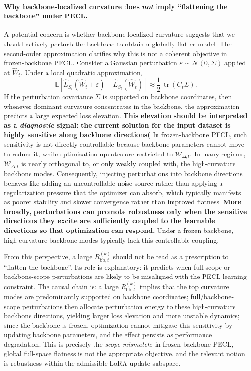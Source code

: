 \documentclass{article}
\theoremstyle{plain}
\theoremstyle{definition}
\theoremstyle{remark}
\begin{document}
\paragraph{Why backbone-localized curvature does \emph{not} imply ``flattening the backbone'' under PECL.}
A potential concern is whether backbone-localized curvature suggests that we should actively perturb the backbone to obtain a globally flatter model. The second-order approximation clarifies why this is not a coherent objective in frozen-backbone PECL. Consider a Gaussian perturbation $\varepsilon\sim\mathcal N(0,\Sigma)$ applied at $\hat W_t$. Under a local quadratic approximation,
$$
\mathbb E\!\left[\hat L_{S_t}(\hat W_t+\varepsilon)-\hat L_{S_t}(\hat W_t)\right]
\approx
\frac12\,\operatorname{tr}(C_t\Sigma).
$$
If the perturbation covariance $\Sigma$ is supported on backbone coordinates, then whenever dominant curvature concentrates in the backbone, the approximation predicts a large expected loss elevation. \textbf{This elevation should be interpreted as a \emph{diagnostic} signal: the current solution for the input dataset is highly sensitive along backbone directions( 
} 
In frozen-backbone PECL, such sensitivity is not directly controllable because backbone parameters cannot move to reduce it, while optimization updates are restricted to $\mathcal W_{\Delta,t}$. In many regimes, $\mathcal W_{\Delta,t}$ is nearly orthogonal to, or only weakly coupled with, the high-curvature backbone modes. Consequently, injecting perturbations into backbone directions behaves like adding an uncontrollable noise source rather than applying a regularization pressure that the optimizer can absorb, which typically manifests as poorer stability and slower convergence rather than improved flatness. \textbf{More broadly, perturbations can promote robustness only when the sensitive directions they excite are sufficiently coupled to the learnable directions so that optimization can respond.} Under a frozen backbone, high-curvature backbone modes typically lack this controllable coupling.

From this perspective, a large $R_{\mathrm{bb},t}^{(k)}$ should not be read as a prescription to ``flatten the backbone''. Its role is explanatory: it predicts when full-scope or backbone-scope perturbations are likely to be misaligned with the PECL learning constraint. The causal chain is: a large $R_{\mathrm{bb},t}^{(k)}$ implies that the top curvature modes are predominantly supported on backbone coordinates; full/backbone-scope perturbations then allocate perturbation energy to these high-curvature backbone directions, yielding larger loss elevation and more unstable dynamics; since the backbone is frozen, optimization cannot mitigate this sensitivity by updating backbone parameters, and the effect persists as performance degradation. This is precisely the \emph{scope mismatch}: in frozen-backbone PECL, global full-space flatness is not the appropriate objective, and the relevant notion is robustness within the admissible LoRA update subspace.
\end{document}

